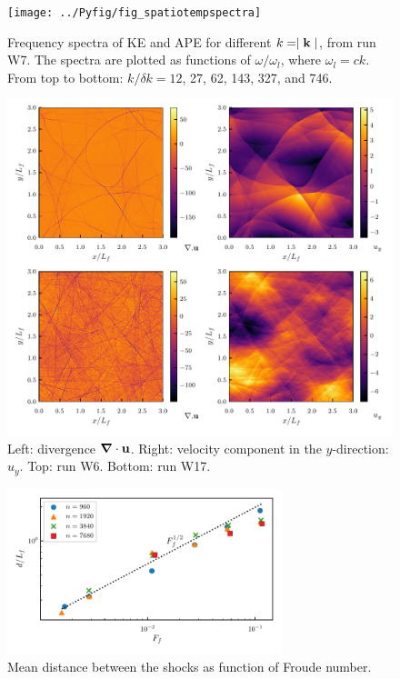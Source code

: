 \begin{figure}
\centerline{\texttt{[image: ../Pyfig/fig\_spatiotempspectra]}}
\caption{Frequency spectra of KE and APE for different $ k = \mid {\bf k} \mid
$, from run W7. The spectra are plotted as functions of $\omega/\omega_l$,
where $\omega_l = c k$. From top to bottom: $ k /\delta k = 12$, 27, 62, 143,
327, and 746. }
\label{fig_spatiotemp_spectra}
\end{figure}

\begin{figure}
\centerline{\includegraphics[width=6.0in]{../Pyfig/fig_phys_fields_wave}}
\caption{Left: divergence $ \boldsymbol{\nabla} \cdot {\bf u} $. Right: velocity component in the $ y $-direction: $ u_y $. Top: run W6. Bottom: run W17.  }
\label{Physical}
\end{figure}

\begin{figure}
\centerline{\includegraphics[width=8cm]{../Pyfig/fig_shock_sep.pdf}}
\caption{Mean distance between the shocks as function of Froude number.  }
\label{fig_distance}
\end{figure}




